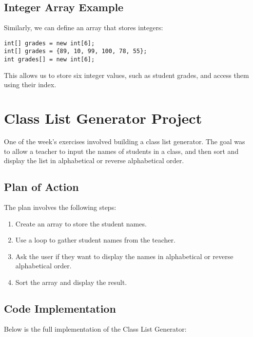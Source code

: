 \documentclass{article}
\begin{document}
\subsection{Integer Array Example}
Similarly, we can define an array that stores integers:
\begin{lstlisting}
int[] grades = new int[6];
int[] grades = {89, 10, 99, 100, 78, 55};
int grades[] = new int[6];
\end{lstlisting}
This allows us to store six integer values, such as student grades, and access them using their index.

\section{Class List Generator Project}
One of the week’s exercises involved building a class list generator. The goal was to allow a teacher to input the names of students in a class, and then sort and display the list in alphabetical or reverse alphabetical order.

\subsection{Plan of Action}
The plan involves the following steps:
\begin{enumerate}
    \item Create an array to store the student names.
    \item Use a loop to gather student names from the teacher.
    \item Ask the user if they want to display the names in alphabetical or reverse alphabetical order.
    \item Sort the array and display the result.
\end{enumerate}

\subsection{Code Implementation}

Below is the full implementation of the Class List Generator:
\end{document}
